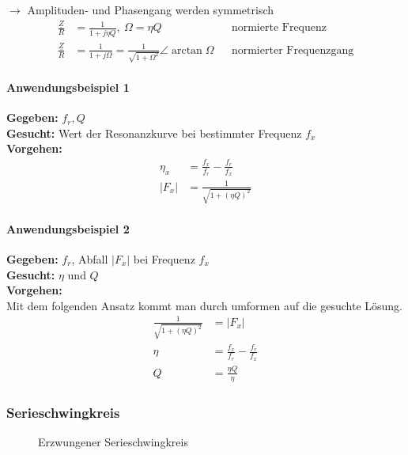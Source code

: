 $\rightarrow$ Amplituden- und Phasengang werden symmetrisch\\
\begin{align}
 	\frac{\underline{Z}}{R} &= \frac{1}{1+j\eta Q},\ \Omega=\eta Q
 	&&\text{normierte Frequenz}\nonumber\\
 	\frac{\underline{Z}}{R} &= \frac{1}{1+j\Omega} =
 	\frac{1}{\sqrt{1+\Omega^2}}\angle
 	\arctan{\Omega} &&\text{normierter
 	Frequenzgang}\nonumber
\end{align}

\paragraph{Anwendungsbeispiel 1}
\textbf{Gegeben:} $f_r, Q$\\
\textbf{Gesucht:} Wert der Resonanzkurve bei bestimmter Frequenz $f_x$\\
\textbf{Vorgehen:}
\begin{align}
	\eta_x &= \frac{f_x}{f_r}-\frac{f_r}{f_x}\nonumber\\
	\left| F_x \right| &= \frac{1}{\sqrt{1+(\eta Q)^2}}\nonumber
\end{align}
\paragraph{Anwendungsbeispiel 2}
\textbf{Gegeben:} $f_r$, Abfall $\left|F_x\right|$ bei Frequenz $f_x$\\
\textbf{Gesucht:} $\eta$ und $Q$\\
\textbf{Vorgehen:} \\
Mit dem folgenden Ansatz kommt man durch umformen auf die gesuchte Lösung. 
\begin{align}
	\frac{1}{\sqrt{1+(\eta Q)^2}} &= \left| F_x \right|\nonumber\\
	\eta &= \frac{f_x}{f_r}-\frac{f_r}{f_x}\nonumber\\
	Q &= \frac{\eta Q}{\eta}\nonumber
\end{align}

\subsubsection{Serieschwingkreis}
\begin{wrapfigure}{l}{0.55\textwidth}
\centering
	
	\vspace{-0.15cm}
	\caption{Erzwungener Serieschwingkreis}
	\vspace{-1.0cm}
	\label{fig:SerieSKErzwungen}
\end{wrapfigure}

